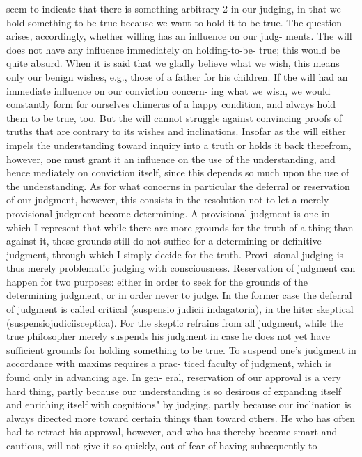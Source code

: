 seem to indicate that there is something arbitrary 2 in our judging, in that
we hold something to be true because we want to hold it to be true. The
question arises, accordingly, whether willing has an influence on our judg-
ments.
The will does not have any influence immediately on holding-to-be-
true; this would be quite absurd. When it is said that we gladly believe what
we wish, this means only our benign wishes, e.g., those of a father for his
children. If the will had an immediate influence on our conviction concern-
ing what we wish, we would constantly form for ourselves chimeras of a
happy condition, and always hold them to be true, too. But the will cannot
struggle against convincing proofs of truths that are contrary to its wishes
and inclinations.
Insofar as the will either impels the understanding toward inquiry into a
truth or holds it back therefrom, however, one must grant it an influence
on the use of the understanding, and hence mediately on conviction itself,
since this depends so much upon the use of the understanding.
As for what concerns in particular the deferral or reservation of our
judgment, however, this consists in the resolution not to let a merely
provisional judgment become determining. A provisional judgment is one in
which I represent that while there are more grounds for the truth of a
thing than against it, these grounds still do not suffice for a determining or
definitive judgment, through which I simply decide for the truth. Provi-
sional judging is thus merely problematic judging with consciousness.
Reservation of judgment can happen for two purposes: either in order to
seek for the grounds of the determining judgment, or in order never to
judge. In the former case the deferral of judgment is called critical
(suspensio judicii indagatoria), in the hiter skeptical (suspensiojudiciisceptica).
For the skeptic refrains from all judgment, while the true philosopher
merely suspends his judgment in case he does not yet have sufficient
grounds for holding something to be true.
To suspend one's judgment in accordance with maxims requires a prac-
ticed faculty of judgment, which is found only in advancing age. In gen-
eral, reservation of our approval is a very hard thing, partly because our
understanding is so desirous of expanding itself and enriching itself with
cognitions" by judging, partly because our inclination is always directed
more toward certain things than toward others. He who has often had to
retract his approval, however, and who has thereby become smart and
cautious, will not give it so quickly, out of fear of having subsequently to
